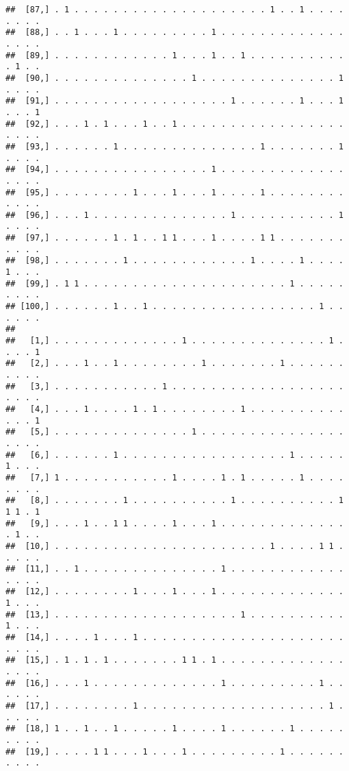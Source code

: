 \documentclass{article}\usepackage[]{graphicx}\usepackage[]{color}
\makeatletter
\newenvironment{kframe}{%
 \def\at@end@of@kframe{}%
 \ifinner\ifhmode%
  \def\at@end@of@kframe{\end{minipage}}%
  \begin{minipage}{\columnwidth}%
 \fi\fi%
 \def\FrameCommand##1{\hskip\@totalleftmargin \hskip-\fboxsep
 \colorbox{shadecolor}{##1}\hskip-\fboxsep
     \hskip-\linewidth \hskip-\@totalleftmargin \hskip\columnwidth}%
 \MakeFramed {\advance\hsize-\width
   \@totalleftmargin\z@ \linewidth\hsize
   \@setminipage}}%
 {\par\unskip\endMakeFramed%
 \at@end@of@kframe}
\newenvironment{knitrout}{}{} %
\makeatother
\begin{document}
\begin{knitrout}
\begin{kframe}
\begin{verbatim}
##  [87,] . 1 . . . . . . . . . . . . . . . . . . . . 1 . . 1 . . . . . . . .
##  [88,] . . 1 . . . 1 . . . . . . . . . 1 . . . . . . . . . . . . . . . . .
##  [89,] . . . . . . . . . . . . 1 . . . 1 . . 1 . . . . . . . . . . . 1 . .
##  [90,] . . . . . . . . . . . . . . 1 . . . . . . . . . . . . . . 1 . . . .
##  [91,] . . . . . . . . . . . . . . . . . . 1 . . . . . . 1 . . . 1 . . . 1
##  [92,] . . . 1 . 1 . . . 1 . . 1 . . . . . . . . . . . . . . . . . . . . .
##  [93,] . . . . . . 1 . . . . . . . . . . . . . . 1 . . . . . . . 1 . . . .
##  [94,] . . . . . . . . . . . . . . . . 1 . . . . . . . . . . . . . . . . .
##  [95,] . . . . . . . . 1 . . . 1 . . . 1 . . . . 1 . . . . . . . . . . . .
##  [96,] . . . 1 . . . . . . . . . . . . . . 1 . . . . . . . . . . 1 . . . .
##  [97,] . . . . . . 1 . 1 . . 1 1 . . . 1 . . . . 1 1 . . . . . . . . . . .
##  [98,] . . . . . . . 1 . . . . . . . . . . . . 1 . . . . 1 . . . . 1 . . .
##  [99,] . 1 1 . . . . . . . . . . . . . . . . . . . . . 1 . . . . . . . . .
## [100,] . . . . . . 1 . . 1 . . . . . . . . . . . . . . . . . 1 . . . . . .
##                                                                           
##   [1,] . . . . . . . . . . . . . 1 . . . . . . . . . . . . . . 1 . . . . 1
##   [2,] . . . 1 . . 1 . . . . . . . . 1 . . . . . . . 1 . . . . . . . . . .
##   [3,] . . . . . . . . . . . 1 . . . . . . . . . . . . . . . . . . . . . .
##   [4,] . . . 1 . . . . 1 . 1 . . . . . . . . 1 . . . . . . . . . . . . . 1
##   [5,] . . . . . . . . . . . . . . 1 . . . . . . . . . . . . . . . . . . .
##   [6,] . . . . . . 1 . . . . . . . . . . . . . . . . . 1 . . . . . 1 . . .
##   [7,] 1 . . . . . . . . . . . 1 . . . . 1 . 1 . . . . . 1 . . . . . . . .
##   [8,] . . . . . . . 1 . . . . . . . . . . 1 . . . . . . . . . . 1 1 1 . 1
##   [9,] . . . 1 . . 1 1 . . . . 1 . . . 1 . . . . . . . . . . . . . . 1 . .
##  [10,] . . . . . . . . . . . . . . . . . . . . . . 1 . . . . 1 1 . . . . .
##  [11,] . . 1 . . . . . . . . . . . . . . 1 . . . . . . . . . . . . . . . .
##  [12,] . . . . . . . . 1 . . . 1 . . . 1 . . . . . . . . . . . . . 1 . . .
##  [13,] . . . . . . . . . . . . . . . . . . . 1 . . . . . . . . . . 1 . . .
##  [14,] . . . . 1 . . . 1 . . . . . . . . . . . . . . . . . . . . . . . . .
##  [15,] . 1 . 1 . 1 . . . . . . . 1 1 . 1 . . . . . . . . . . . . . . . . .
##  [16,] . . . 1 . . . . . . . . . . . . . 1 . . . . . . . . . 1 . . . . . .
##  [17,] . . . . . . . . 1 . . . . . . . . . . . . . . . . . . . 1 . . . . .
##  [18,] 1 . . 1 . . 1 . . . . . 1 . . . . 1 . . . . . . 1 . . . . . . . . .
##  [19,] . . . . 1 1 . . . 1 . . . 1 . . . . . . . . . 1 . . . . . . . . . .

\end{verbatim}
\end{kframe}
\end{knitrout}
\end{document}

